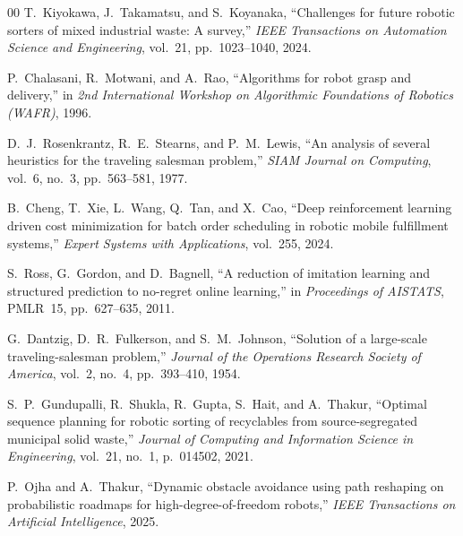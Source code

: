 \documentclass[conference]{IEEEtran}
\begin{document}
\begin{thebibliography}{00}
 T.~Kiyokawa, J.~Takamatsu, and S.~Koyanaka, ``Challenges for future robotic sorters of mixed industrial waste: A survey,'' \emph{IEEE Transactions on Automation Science and Engineering}, vol.~21, pp.~1023--1040, 2024.

 P.~Chalasani, R.~Motwani, and A.~Rao, ``Algorithms for robot grasp and delivery,'' in \emph{2nd International Workshop on Algorithmic Foundations of Robotics (WAFR)}, 1996.

 D.~J.~Rosenkrantz, R.~E.~Stearns, and P.~M.~Lewis, ``An analysis of several heuristics for the traveling salesman problem,'' \emph{SIAM Journal on Computing}, vol.~6, no.~3, pp.~563--581, 1977.

 B.~Cheng, T.~Xie, L.~Wang, Q.~Tan, and X.~Cao, ``Deep reinforcement learning driven cost minimization for batch order scheduling in robotic mobile fulfillment systems,'' \emph{Expert Systems with Applications}, vol.~255, 2024.

 S.~Ross, G.~Gordon, and D.~Bagnell, ``A reduction of imitation learning and structured prediction to no-regret online learning,'' in \emph{Proceedings of AISTATS}, PMLR~15, pp.~627--635, 2011.

 G.~Dantzig, D.~R.~Fulkerson, and S.~M.~Johnson, ``Solution of a large-scale traveling-salesman problem,'' \emph{Journal of the Operations Research Society of America}, vol.~2, no.~4, pp.~393--410, 1954.

 S.~P.~Gundupalli, R.~Shukla, R.~Gupta, S.~Hait, and A.~Thakur, ``Optimal sequence planning for robotic sorting of recyclables from source-segregated municipal solid waste,'' \emph{Journal of Computing and Information Science in Engineering}, vol.~21, no.~1, p.~014502, 2021.

 P.~Ojha and A.~Thakur, ``Dynamic obstacle avoidance using path reshaping on probabilistic roadmaps for high-degree-of-freedom robots,'' \emph{IEEE Transactions on Artificial Intelligence}, 2025.

\end{thebibliography}
\end{document}
